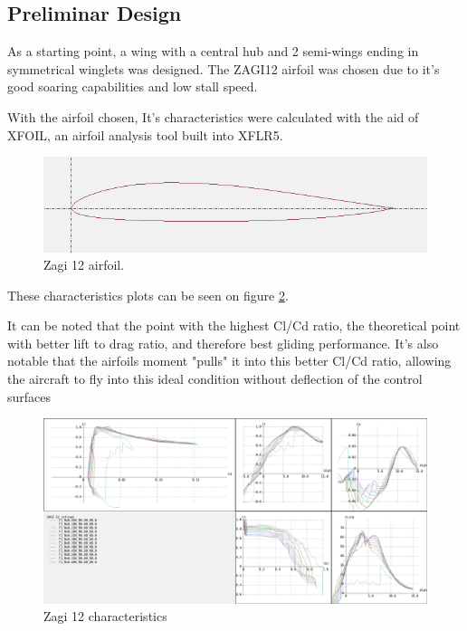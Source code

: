 \subsection{Preliminar Design}

As a starting point, a wing with a central hub and 2 semi-wings ending in symmetrical winglets was designed. The ZAGI12 airfoil was chosen due to it's good soaring capabilities and low stall speed.

With the airfoil chosen, It's characteristics were calculated with the aid of XFOIL, an airfoil analysis tool built into XFLR5.

\begin{figure}
\centering
  \includegraphics[width=\linewidth]{figs/zagi12.png}
  \caption{Zagi 12 airfoil.}
  \label{fig:zagi12}
\end{figure}


These characteristics plots can be seen on figure \ref{fig:zagi12polares}.
%

It can be noted that the point with the highest Cl/Cd ratio, the theoretical point with better lift to drag ratio, and therefore best gliding performance. It's also notable that the airfoils moment "pulls" it into this better Cl/Cd ratio, allowing the aircraft to fly into this ideal condition without deflection of the control surfaces


\begin{figure}
\centering
  \includegraphics[width=\linewidth]{figs/polares.png}
  \caption{Zagi 12 characteristics}
  \label{fig:zagi12polares}
\end{figure}

